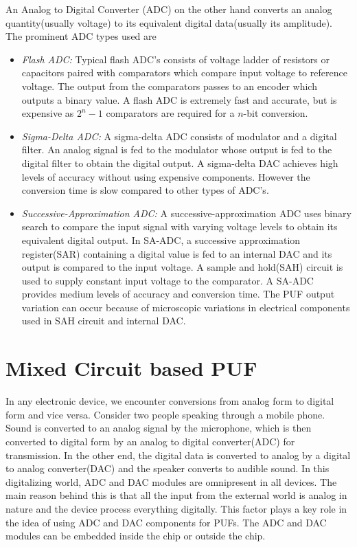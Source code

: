 An Analog to Digital Converter (ADC) on the other hand converts an analog quantity(usually voltage) to its equivalent digital data(usually its amplitude). The prominent ADC types used are
\begin{itemize}
\item \textit{Flash ADC:} Typical flash ADC's consists of voltage ladder of resistors or capacitors paired with comparators which compare input voltage to reference voltage. The output from the comparators passes to an encoder which outputs a binary value. A flash ADC is extremely fast and accurate, but is expensive as $2^{n}-1$ comparators are required for a $n$-bit conversion.
\item \textit{Sigma-Delta ADC:} A sigma-delta ADC consists of modulator and a digital filter. An analog signal is fed to the modulator whose output is fed to the digital filter to obtain the digital output. A sigma-delta DAC achieves high levels of accuracy without using expensive components. However the conversion time is slow compared to other types of ADC's.
\item \textit{Successive-Approximation ADC:} A successive-approximation ADC uses binary search to compare the input signal with varying voltage levels to obtain its equivalent digital output. In SA-ADC, a successive approximation register(SAR) containing a digital value is fed to an internal DAC and its output is compared to the input voltage. A sample and hold(SAH) circuit is used to supply constant input voltage to the comparator. A SA-ADC provides medium levels of accuracy and conversion time. The PUF output variation can occur because of microscopic variations in electrical components used in SAH circuit and internal DAC.

\end{itemize}

\section{Mixed Circuit based PUF}
In any electronic device, we encounter conversions from analog form to digital form and vice versa. Consider
two people speaking through a mobile phone. Sound is converted to an analog signal by the microphone, which is
then converted to digital form by an analog to digital converter(ADC) for transmission. In the other end, the digital
data is converted to analog by a digital to analog converter(DAC) and the speaker converts to audible sound. In this
digitalizing world, ADC and DAC modules are omnipresent in all devices. The main reason behind this is that all the input from
the external world is analog in nature and the device process everything digitally. This factor plays a key role in
the idea of using ADC and DAC components for PUFs. The ADC and DAC modules can be embedded inside the chip or outside the chip.

